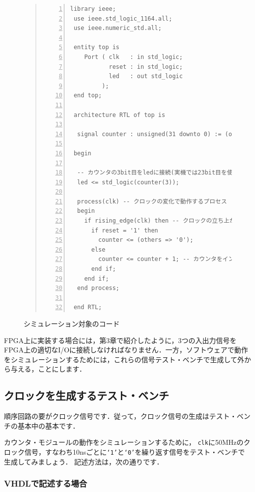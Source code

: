 \documentclass[a4paper,dvipdfmx]{jsarticle}
\begin{document}
\begin{figure}[H]
\begin{quote}
\begin{Verbatim}[frame=single, numbers=left, baselinestretch=0.8]
 library ieee;
 use ieee.std_logic_1164.all;
 use ieee.numeric_std.all;

 entity top is
    Port ( clk   : in std_logic;
           reset : in std_logic;
           led   : out std_logic
         );
 end top;

 architecture RTL of top is

  signal counter : unsigned(31 downto 0) := (others => '0');

 begin

  -- カウンタの3bit目をledに接続(実機では23bit目を使った)
  led <= std_logic(counter(3));

  process(clk) -- クロックの変化で動作するプロセス
  begin
    if rising_edge(clk) then -- クロックの立ち上がりであれば
      if reset = '1' then
        counter <= (others => '0');
      else
        counter <= counter + 1; -- カウンタをインクリメント
      end if;
    end if;
  end process;

 end RTL;
\end{Verbatim}
\end{quote}
\caption{シミュレーション対象のコード\label{fig:target_list}}
\end{figure}

FPGA上に実装する場合には，第3章で紹介したように，3つの入出力信号をFPGA上の適切なI/Oに接続しなければなりません．一方，ソフトウェアで動作をシミュレーションするためには，これらの信号テスト・ベンチで生成して外から与える，ことにします．

\subsection{クロックを生成するテスト・ベンチ}
順序回路の要がクロック信号です．従って，クロック信号の生成はテスト・ベンチの基本中の基本です．

カウンタ・モジュールの動作をシミュレーションするために，
\verb|clk|に50MHzのクロック信号，すなわち10nsごとに\verb|‘1’|と\verb|‘0’|を繰り返す信号をテスト・ベンチで生成してみましょう．
記述方法は，次の通りです．

\subsubsection{VHDLで記述する場合}
\end{document}
